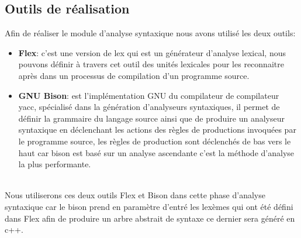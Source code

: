 \documentclass{../res/univ-projet}
\begin{document}
  \newpage
 \subsection{Outils de réalisation} 
 Afin de réaliser le module d'analyse syntaxique nous avons utilisé les deux outils:
 \begin{itemize}
 \item  \textbf{Flex}: c'est une version de lex qui est un générateur d'analyse lexical, nous pouvons définir à travers cet outil des unités lexicales pour les reconnaitre après dans un processus de compilation d'un programme source.
\item \textbf{GNU Bison}: est l'implémentation GNU du compilateur de compilateur yacc, spécialisé dans la génération d'analyseurs syntaxiques, il permet de définir la grammaire du langage source ainsi que de produire un analyseur syntaxique en déclenchant les actions des règles de productions invoquées par le programme source, les règles de production sont déclenchés de bas vers le haut car bison est basé sur un analyse ascendante c'est la méthode d'analyse la plus performante.
 
\end{itemize}   ~\\
Nous utiliserons ces deux outils Flex et Bison dans cette phase d'analyse syntaxique car le bison prend en paramètre d'entré les lexèmes qui ont été défini dans Flex afin de produire un arbre abstrait de syntaxe ce dernier sera généré en c++.
\end{document}

